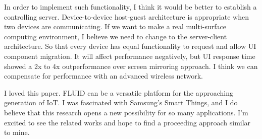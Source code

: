 \documentclass[10pt,a4paper]{article}
\begin{document}
	In order to implement such functionality, I think it would be better to establish a controlling server. Device-to-device host-guest architecture is appropriate when two devices are communicating. If we want to make a real multi-surface computing environment, I believe we need to change to the server-client architecture. So that every device has equal functionality to request and allow UI component migration. It will affect performance negatively, but UI response time showed a 2x to 4x outperformance over screen mirroring approach. I think we can compensate for performance with an advanced wireless network.
	
	I loved this paper. FLUID can be a versatile platform for the approaching generation of IoT. I was fascinated with Samsung's Smart Things, and I do believe that this research opens a new possibility for so many applications. I'm excited to see the related works and hope to find a proceeding approach similar to mine.
		
\end{document}
